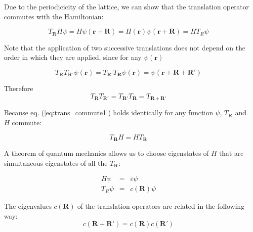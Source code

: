 Due to the periodicicity of the lattice, we can show that the translation operator commutes with the Hamiltonian:

\begin{equation} \label{eq:trans_commute1}
T_{\boldsymbol{R}} H \psi
= H \psi(\boldsymbol{r} + \boldsymbol{R})
= H(\boldsymbol{r}) \psi(\boldsymbol{r} + \boldsymbol{R})
= HT_{R} \psi
\end{equation}

Note that the application of two successive translations does not depend on the order in which they are applied, since for any $\psi(\boldsymbol{r})$

\begin{equation} \label{eq:trans_commute2}
T_{\boldsymbol{R}} T_{\boldsymbol{R'}} \psi(\boldsymbol{r})
= T_{\boldsymbol{R'}} T_{\boldsymbol{R}} \psi(\boldsymbol{r})
= \psi(\boldsymbol{r} + \boldsymbol{R} + \boldsymbol{R'})
\end{equation}

Therefore
\begin{equation} \label{eq:trans_addition}
T_{\boldsymbol{R}} T_{\boldsymbol{R'}}
= T_{\boldsymbol{R'}} T_{\boldsymbol{R}}
= T_{\boldsymbol{R + R'}}
\end{equation}

Because eq. (\ref{eq:trans_commute1}) holds identically for any function $\psi$, $T_{\boldsymbol{R}}$ and $H$ commute:

\begin{equation} \label{eq:trans_commute_relation}
T_{\boldsymbol{R}} H = H T_{\boldsymbol{R}}
\end{equation}

A theorem of quantum mechanics  allows us to choose eigenstates of $H$ that are simultaneous eigenstates of all the $T_{\boldsymbol{R}}$:

\begin{eqnarray} 
H\psi &=& \varepsilon\psi \nonumber \\
T_{R} \psi &=& c(\boldsymbol{R}) \psi \label{eq:eigenstates}
\end{eqnarray}

The eigenvalues $c(\boldsymbol{R})$ of the translation operators are related in the following way:
\begin{equation} \label{eq:c_relation}
c(\boldsymbol{R} + \boldsymbol{R'}) 
= c(\boldsymbol{R}) c(\boldsymbol{R}')
\end{equation}


